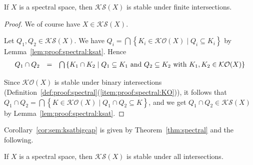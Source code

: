 \documentclass[%
  a4paper,
  UKenglish,
  cleveref,
  autoref,
  thm-restate,
  numberwithinsect,
]{lipics-v2021}
\newcommand\sle\subseteq
\newcommand\Open{\mathcal{O}}		%
\newcommand\K{\mathcal{K}}		%
\newcommand\Sat{\mathcal{S}}		%
\begin{document}
\begin{lemma}
\label{lem:proof:spectral:coh}
If $X$ is a spectral space, then $\K\Sat(X)$ is stable under finite
intersections.
\end{lemma}

\begin{proof}
We of course have $X \in \K\Sat(X)$.

Let $Q_1, Q_2 \in \K\Sat(X)$.
We have
$Q_i = \bigcap \left\{ K_i \in \K\Open(X) \mid Q_i \sle K_i \right\}$
by Lemma~\ref{lem:proof:spectral:ksat}.
Hence
\[
\begin{array}{l l l}
  Q_1 \cap Q_2
& =
& \bigcap \left\{
  K_1 \cap K_2
  \mid
  \text{$Q_1 \sle K_1$ and $Q_2 \sle K_2$ with $K_1,K_2 \in \K\Open(X)$}
  \right\}
\end{array}
\]

Since $\K\Open(X)$ is stable under binary intersections
(Definition~\ref{def:proof:spectral}(\ref{item:proof:spectral:KO})),
it follows that
$Q_1 \cap Q_2 = \bigcap \left\{ K \in \K\Open(X) \mid Q_1 \cap Q_2 \sle K \right\}$,
and we get $Q_1 \cap Q_2 \in \K\Sat(X)$
by Lemma~\ref{lem:proof:spectral:ksat}.
\end{proof}

Corollary~\ref{cor:sem:ksatbigcap} is given by Theorem~\ref{thm:spectral}
and the following.


\begin{corollary}
\label{cor:proof:spectral:ksatbigcap}
If $X$ is a spectral space, then $\K\Sat(X)$ is stable under all intersections.
\end{corollary}
\end{document}
